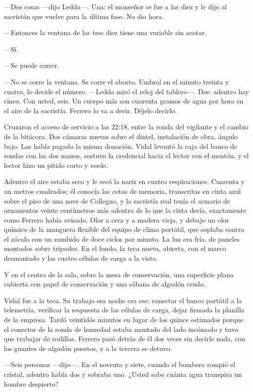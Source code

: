 ---Dos cosas ---dijo Ledda---. Una: el monseñor se fue a las diez y le dijo al sacristán que vuelve para la última fase. No dio hora.

---Entonces la ventana de las tres diez tiene una variable sin acotar.

---Sí.

---Se puede correr.

---No se corre la ventana. Se corre el aborto. Umbral en el minuto treinta y cuatro, lo decide el número. ---Ledda miró el reloj del tablero---. Dos: adentro hay cinco. Con usted, seis. Un cuerpo más son cuarenta gramos de agua por hora en el aire de la sacristía. Ferrero lo va a decir. Déjelo decirlo.

Cruzaron el acceso de servicio a las 22:18, entre la ronda del vigilante y el cambio de la bitácora. Dos cámaras nuevas sobre el dintel, instalación de obra, ángulo bajo. Las había pagado la misma donación. Vidal levantó la caja del banco de sondas con las dos manos, sostuvo la credencial hacia el lector con el mentón, y el lector hizo un pitido corto y verde.

Adentro el aire estaba seco y le secó la nariz en cuatro respiraciones. Cuarenta y un metros cuadrados; él conocía las cotas de memoria, transcritas en cinta azul sobre el piso de una nave de Collegno, y la sacristía real tenía el armario de ornamentos veinte centímetros más adentro de lo que la cinta decía, exactamente como Ferrero había avisado. Olor a cera y a madera vieja, y debajo un olor químico de la manguera flexible del equipo de clima portátil, que soplaba contra el zócalo con un zumbido de doce ciclos por minuto. La luz era fría, de paneles montados sobre trípodes. En el fondo, la teca nueva, abierta, con el marco desmontado y las cuatro células de carga a la vista.

Y en el centro de la sala, sobre la mesa de conservación, una superficie plana cubierta con papel de conservación y una sábana de algodón crudo.

Vidal fue a la teca. Su trabajo esa noche era ese: conectar el banco portátil a la telemetría, verificar la respuesta de las células de carga, dejar firmada la planilla de la empresa. Tardó veintidós minutos en lugar de los quince estimados porque el conector de la sonda de humedad estaba montado del lado incómodo y tuvo que trabajar de rodillas. Ferrero pasó detrás de él dos veces sin decirle nada, con los guantes de algodón puestos, y a la tercera se detuvo.

---Seis personas ---dijo---. En el noventa y siete, cuando el bombero rompió el cristal, adentro había dos y sobraba uno. ¿Usted sabe cuánta agua transpira un hombre despierto?

